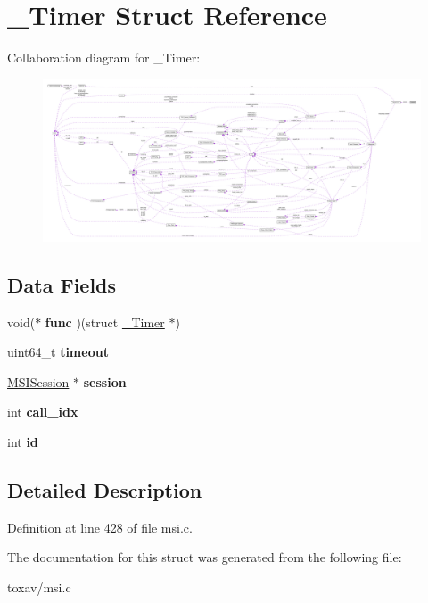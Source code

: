 \hypertarget{struct___timer}{\section{\+\_\+\+Timer Struct Reference}
\label{struct___timer}
}


Collaboration diagram for \+\_\+\+Timer\+:
\nopagebreak
\begin{figure}[H]
\begin{center}
\leavevmode
\includegraphics[width=350pt]{struct___timer__coll__graph}
\end{center}
\end{figure}
\subsection*{Data Fields}
\begin{DoxyCompactItemize}
\item 
\hypertarget{struct___timer_a7b75ecf42c49a289b6dd4fefdbf86605}{void($\ast$ {\bfseries func} )(struct \hyperlink{struct___timer}{\+\_\+\+Timer} $\ast$)}\label{struct___timer_a7b75ecf42c49a289b6dd4fefdbf86605}

\item 
\hypertarget{struct___timer_a053cdea1d85795444fe1aaa6b277a0ec}{uint64\+\_\+t {\bfseries timeout}}\label{struct___timer_a053cdea1d85795444fe1aaa6b277a0ec}

\item 
\hypertarget{struct___timer_affcb6f96b80aecebae0f1b157c6242b5}{\hyperlink{struct___m_s_i_session}{M\+S\+I\+Session} $\ast$ {\bfseries session}}\label{struct___timer_affcb6f96b80aecebae0f1b157c6242b5}

\item 
\hypertarget{struct___timer_a1137c8c8a662d51868eda69bd73915d0}{int {\bfseries call\+\_\+idx}}\label{struct___timer_a1137c8c8a662d51868eda69bd73915d0}

\item 
\hypertarget{struct___timer_a7441ef0865bcb3db9b8064dd7375c1ea}{int {\bfseries id}}\label{struct___timer_a7441ef0865bcb3db9b8064dd7375c1ea}

\end{DoxyCompactItemize}


\subsection{Detailed Description}


Definition at line 428 of file msi.\+c.



The documentation for this struct was generated from the following file\+:\begin{DoxyCompactItemize}
\item 
toxav/msi.\+c\end{DoxyCompactItemize}
